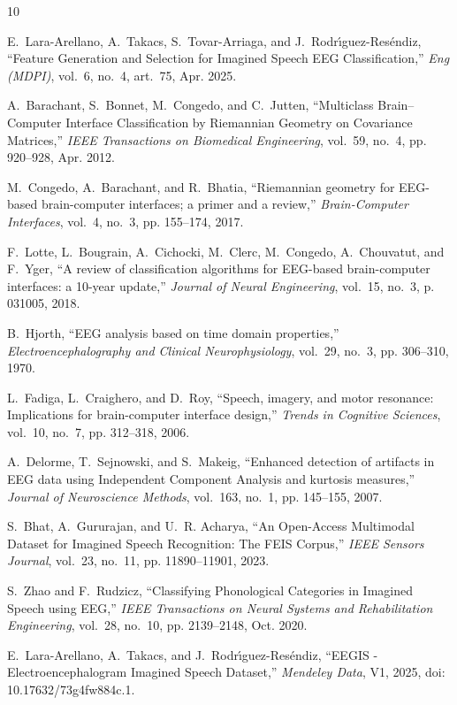 \documentclass[10pt,twocolumn,a4paper]{article}
\begin{document}
\begin{thebibliography}{10}

E.~Lara-Arellano, A.~Takacs, S.~Tovar-Arriaga, and J.~Rodr{\'\i}guez-Res{\'e}ndiz,
\newblock ``Feature Generation and Selection for Imagined Speech EEG Classification,''
\newblock \emph{Eng (MDPI)}, vol.~6, no.~4, art.~75, Apr. 2025.

A.~Barachant, S.~Bonnet, M.~Congedo, and C.~Jutten,
\newblock ``Multiclass Brain--Computer Interface Classification by Riemannian Geometry on Covariance Matrices,''
\newblock \emph{IEEE Transactions on Biomedical Engineering}, vol.~59, no.~4, pp. 920--928, Apr. 2012.

M.~Congedo, A.~Barachant, and R.~Bhatia,
\newblock ``Riemannian geometry for EEG-based brain-computer interfaces; a primer and a review,''
\newblock \emph{Brain-Computer Interfaces}, vol.~4, no.~3, pp. 155--174, 2017.

F.~Lotte, L.~Bougrain, A.~Cichocki, M.~Clerc, M.~Congedo, A.~Chouvatut, and F.~Yger,
\newblock ``A review of classification algorithms for EEG-based brain-computer interfaces: a 10-year update,''
\newblock \emph{Journal of Neural Engineering}, vol.~15, no.~3, p. 031005, 2018.

B.~Hjorth,
\newblock ``EEG analysis based on time domain properties,''
\newblock \emph{Electroencephalography and Clinical Neurophysiology}, vol.~29, no.~3, pp. 306--310, 1970.

L.~Fadiga, L.~Craighero, and D.~Roy,
\newblock ``Speech, imagery, and motor resonance: Implications for brain-computer interface design,''
\newblock \emph{Trends in Cognitive Sciences}, vol.~10, no.~7, pp. 312--318, 2006.

A.~Delorme, T.~Sejnowski, and S.~Makeig,
\newblock ``Enhanced detection of artifacts in EEG data using Independent Component Analysis and kurtosis measures,''
\newblock \emph{Journal of Neuroscience Methods}, vol.~163, no.~1, pp. 145--155, 2007.

S.~Bhat, A.~Gururajan, and U.~R. Acharya,
\newblock ``An Open-Access Multimodal Dataset for Imagined Speech Recognition: The FEIS Corpus,''
\newblock \emph{IEEE Sensors Journal}, vol.~23, no.~11, pp. 11890--11901, 2023.

S.~Zhao and F.~Rudzicz,
\newblock ``Classifying Phonological Categories in Imagined Speech using EEG,''
\newblock \emph{IEEE Transactions on Neural Systems and Rehabilitation Engineering}, vol.~28, no.~10, pp. 2139--2148, Oct. 2020.

E.~Lara-Arellano, A.~Takacs, and J.~Rodr{\'\i}guez-Res{\'e}ndiz,
\newblock ``EEGIS - Electroencephalogram Imagined Speech Dataset,''
\newblock \emph{Mendeley Data}, V1, 2025, doi: 10.17632/73g4fw884c.1.

\end{thebibliography}
\end{document}
